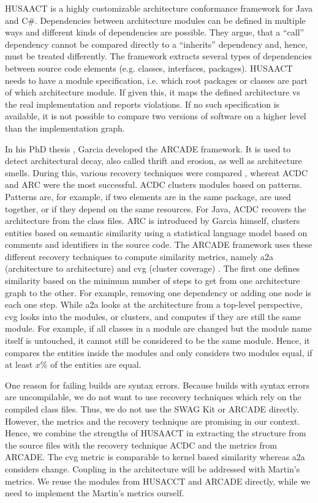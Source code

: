 \documentclass[sigplan, anonymous, review]{acmart}
\begin{document}
HUSAACT \cite{Husacct1,Husacct2} is a highly customizable architecture conformance framework for Java and C\#. Dependencies between architecture modules can be defined in multiple ways and different kinds of dependencies are possible. They argue, that a ``call'' dependency cannot be compared directly to a ``inherits'' dependency and, hence, must be treated differently. 
The framework extracts several types of dependencies between source code elements (e.g. classes, interfaces, packages). HUSAACT needs to have a module specification, i.e. which root packages or classes are part of which architecture module. If given this, it maps the defined architecture vs the real implementation and reports violations.
If no such specification is available, it is not possible to compare two versions of software on a higher level than the implementation graph. 

In his PhD thesis \cite{arcade-thesis}, Garcia developed the ARCADE framework. It is used to detect architectural decay, also called thrift and erosion, as well as architecture smells. During this, various recovery techniques were compared \cite{arcRec-comparison}, whereat ACDC \cite{ACDC} and ARC were the most successful. 
ACDC clusters modules based on patterns. Patterns are, for example, if two elements are in the same package, are used together, or if they depend on the same resources. For Java, ACDC recovers the architecture from the class files. ARC is introduced by Garcia himself, clusters entities based on semantic similarity using a statistical language model based on comments and identifiers in the source code.
The ARCADE framework uses these different recovery techniques to compute similarity metrics, namely a2a (architecture to architecture) and cvg (cluster coverage) \cite{Arcade}. 
The first one defines similarity based on the minimum number of steps to get from one architecture graph to the other. For example, removing one dependency or adding one node is each one step. While a2a looks at the architecture from a top-level perspective, cvg looks into the modules, or clusters, and computes if they are still the same module. For example, if all classes in a module are changed but the module name itself is untouched, it cannot still be considered to be the same module. Hence, it compares the entities inside the modules and only considers two modules equal, if at least $x \%$ of the entities are equal.

One reason for failing builds are syntax errors. Because builds with syntax errors are uncompilable, we do not want to use recovery techniques which rely on the compiled class files. Thus, we do not use the SWAG Kit or ARCADE directly.
However, the metrics and the recovery technique are promising in our context. Hence, we combine the strengths of HUSAACT in extracting the structure from the source files with the recovery technique ACDC and the metrics from ARCADE. The cvg metric is comparable to kernel based similarity whereas a2a considers change. Coupling in the architecture will be addressed with Martin's metrics. We reuse the modules from HUSACCT and ARCADE directly, while we need to implement the Martin's metrics ourself. 
\end{document}
